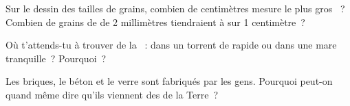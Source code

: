\begin{exercise}[$\star\star$]\label{exo:g3:stones-pebbles-sand:8}
Sur le dessin des tailles de grains, combien de centimètres mesure le plus
gros ~? Combien de grains de  de 2 millimètres tiendraient 
à  sur 1 centimètre~?
\end{exercise}

\begin{exercise}[$\star\star$]\label{exo:g3:stones-pebbles-sand:9}
Où t'attends-tu à trouver de la ~: dans un torrent de  rapide
ou dans une mare tranquille~? Pourquoi~?
\end{exercise}

\begin{exercise}[$\star\star$]\label{exo:g3:stones-pebbles-sand:10}
Les briques, le béton et le verre sont fabriqués par les gens. Pourquoi
peut-on quand même dire qu'ils viennent des  de la Terre~?
\end{exercise}
